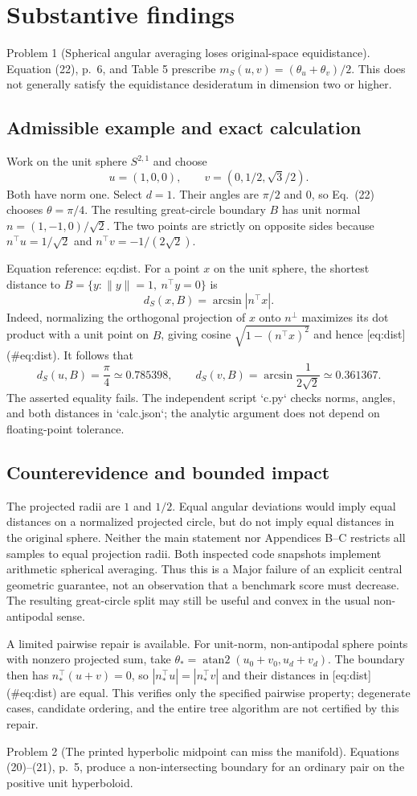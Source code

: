 \documentclass[10pt]{article}
\begin{document}
\section*{Substantive findings}
Problem 1 (Spherical angular averaging loses original-space equidistance).  Equation (22), p. 6, and Table 5 prescribe \(m_S(u,v)=(\theta_u+\theta_v)/2\). This does not generally satisfy the equidistance desideratum in dimension two or higher.\par
\subsection*{Admissible example and exact calculation}
Work on the unit sphere \(S^{2,1}\) and choose \[u=(1,0,0),\qquad v=(0,1/2,\sqrt3/2).\] Both have norm one. Select \(d=1\). Their angles are \(\pi/2\) and \(0\), so Eq. (22) chooses \(\theta=\pi/4\). The resulting great-circle boundary \(B\) has unit normal \(n=(1,-1,0)/\sqrt2\). The two points are strictly on opposite sides because \(n^\top u=1/\sqrt2\) and \(n^\top v=-1/(2\sqrt2)\).\par
Equation reference: eq:dist. For a point \(x\) on the unit sphere, the shortest distance to \(B=\{y:\|y\|=1,\ n^\top y=0\}\) is \[
d_S(x,B)=\arcsin|n^\top x|.\] Indeed, normalizing the orthogonal projection of \(x\) onto \(n^\perp\) maximizes its dot product with a unit point on \(B\), giving cosine \(\sqrt{1-(n^\top x)^2}\) and hence [eq:dist] (\#eq:dist). It follows that \[d_S(u,B)=\frac{\pi}{4}\simeq0.785398,\qquad
d_S(v,B)=\arcsin\frac{1}{2\sqrt2}\simeq0.361367.\] The asserted equality fails. The independent script `c.py` checks norms, angles, and both distances in `calc.json`; the analytic argument does not depend on floating-point tolerance.\par
\subsection*{Counterevidence and bounded impact}
The projected radii are \(1\) and \(1/2\). Equal angular deviations would imply equal distances on a normalized projected circle, but do not imply equal distances in the original sphere. Neither the main statement nor Appendices B–C restricts all samples to equal projection radii. Both inspected code snapshots implement arithmetic spherical averaging. Thus this is a Major failure of an explicit central geometric guarantee, not an observation that a benchmark score must decrease. The resulting great-circle split may still be useful and convex in the usual non-antipodal sense.\par
A limited pairwise repair is available. For unit-norm, non-antipodal sphere points with nonzero projected sum, take \(\theta_*=\operatorname{atan2}(u_0+v_0,u_d+v_d)\). The boundary then has \(n_*^\top(u+v)=0\), so \(|n_*^\top u|=|n_*^\top v|\) and their distances in [eq:dist] (\#eq:dist) are equal. This verifies only the specified pairwise property; degenerate cases, candidate ordering, and the entire tree algorithm are not certified by this repair.\par
Problem 2 (The printed hyperbolic midpoint can miss the manifold).  Equations (20)–(21), p. 5, produce a non-intersecting boundary for an ordinary pair on the positive unit hyperboloid.\par
\end{document}
